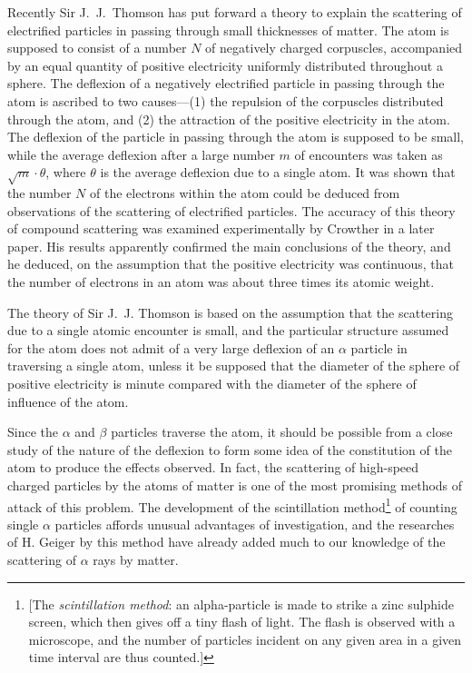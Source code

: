 Recently Sir J.\ J.\ Thomson has put forward a theory to explain the
scattering of electrified particles in passing through small thicknesses
of matter. The atom is supposed to consist of a number $N$ of
negatively charged corpuscles, accompanied by an equal quantity of
positive electricity uniformly distributed throughout a sphere. The
deflexion of a negatively electrified particle in passing through the
atom is ascribed to two causes---(1) the repulsion of the corpuscles
distributed through the atom, and (2) the attraction of the positive
electricity in the atom. The deflexion of the particle in passing
through the atom is supposed to be small, while the average deflexion
after a large number $m$ of encounters was taken as
$\sqrt{m} \cdot \theta$, where $\theta$ is the average deflexion due to a
single atom. It was shown that the number $N$ of the electrons
within the atom could be deduced from observations of the scattering of
electrified particles. The accuracy of this theory of compound
scattering was examined experimentally by Crowther in a later paper. His
results apparently confirmed the main conclusions of the theory, and he
deduced, on the assumption that the positive electricity was continuous,
that the number of electrons in an atom was about three times its atomic
weight.

The theory of Sir J.~J. Thomson is based on the assumption that the
scattering due to a single atomic encounter is small, and the particular
structure assumed for the atom does not admit of a very large deflexion
of an $\alpha$ particle in traversing a single atom, unless it be
supposed that the diameter of the sphere of positive electricity is
minute compared with the diameter of the sphere of influence of the
atom.

Since the $\alpha$ and $\beta$ particles traverse the atom, it should
be possible from a close study of the nature of the deflexion to form
some idea of the constitution of the atom to produce the effects
observed. In fact, the scattering of high-speed charged particles by the
atoms of matter is one of the most promising methods of attack of this
problem. The development of the scintillation method\footnote{{[}The
  \emph{scintillation method}: an alpha-particle is made to strike a
  zinc sulphide screen, which then gives off a tiny flash of light. The
  flash is observed with a microscope, and the number of particles
  incident on any given area in a given time interval are thus
  counted.{]}} of counting single $\alpha$ particles affords unusual
advantages of investigation, and the researches of H. Geiger by this
method have already added much to our knowledge of the scattering of
$\alpha$ rays by matter.


